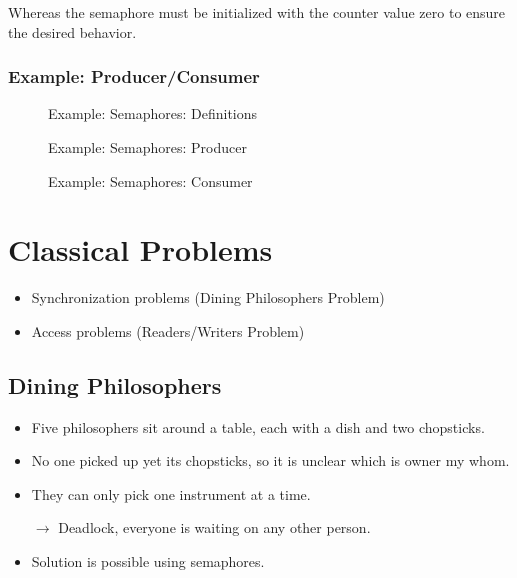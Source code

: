 				Whereas the semaphore must be initialized with the counter value zero to ensure the desired behavior.

            \subsubsection{Example: Producer/Consumer}
                \begin{figure}[H]
                	\centering
                	
					\caption{Example: Semaphores: Definitions}
				\end{figure}

				\begin{figure}[H]
					\centering
					
					\caption{Example: Semaphores: Producer}
				\end{figure}

				\begin{figure}[H]
					\centering
					
                	\caption{Example: Semaphores: Consumer}
                \end{figure}

    \section{Classical Problems}
        \begin{itemize}
        	\item Synchronization problems (Dining Philosophers Problem)
        	\item Access problems (Readers/Writers Problem)
        \end{itemize}

        \subsection{Dining Philosophers}
            \begin{itemize}
            	\item Five philosophers sit around a table, each with a dish and two chopsticks.
            	\item No one picked up yet its chopsticks, so it is unclear which is owner my whom.
            	\item They can only pick one instrument at a time.
            	\item[\(\rightarrow\)] Deadlock, everyone is waiting on any other person.
            	\item Solution is possible using semaphores.
            \end{itemize}
        
